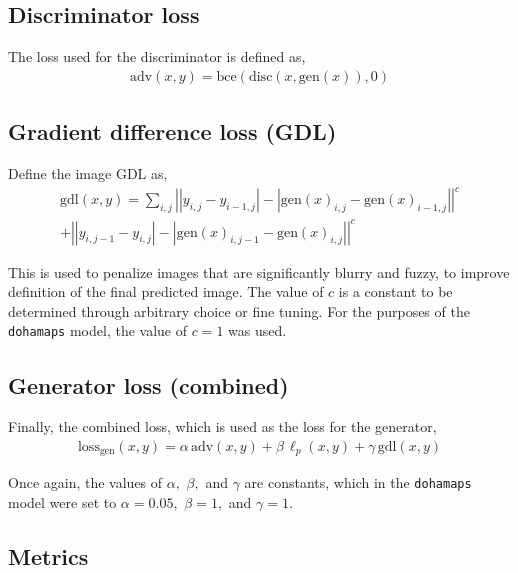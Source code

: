 \documentclass{article}
\begin{document}
\subsection*{Discriminator loss}

The loss used for the discriminator is defined as,
\begin{align*}
    \mathrm{adv}(x, y) =
    \mathrm{bce}(\mathrm{disc}(x, \mathrm{gen}(x)), 0)
\end{align*}

\subsection*{Gradient difference loss (GDL)}

Define the image GDL \cite{multiscale} as,
\begin{align*}
    \mathrm{gdl}(x, y) = \sum_{i, j}\left||y_{i, j} - y_{i - 1, j}| -
    |\mathrm{gen}(x)_{i, j} - \mathrm{gen}(x)_{i - 1, j}|\right|^c\\
    + \left||y_{i, j - 1} - y_{i, j}| -
    |\mathrm{gen}(x)_{i, j - 1} - \mathrm{gen}(x)_{i, j}|\right|^c
\end{align*}

This is used to penalize images that are significantly blurry and fuzzy, to improve definition of the final predicted image. The value of $c$ is a constant to be determined through arbitrary choice or fine tuning. For the purposes of the \texttt{dohamaps} model, the value of $c = 1$ was used.

\subsection*{Generator loss (combined)}

Finally, the combined loss, which is used as the loss for the generator,
\begin{align*}
    \mathrm{loss}_{\mathrm{gen}}(x, y) = \alpha\, \mathrm{adv}(x, y) +
    \beta\, \mathrm{\ell}_p(x, y) + \gamma\, \mathrm{gdl}(x, y)
\end{align*}

Once again, the values of $\alpha,$ $\beta,$ and $\gamma$ are constants, which in the \texttt{dohamaps} model were set to $\alpha = 0.05,$ $\beta = 1,$ and $\gamma = 1$.

\clearpage

\subsection{Metrics}
\end{document}
